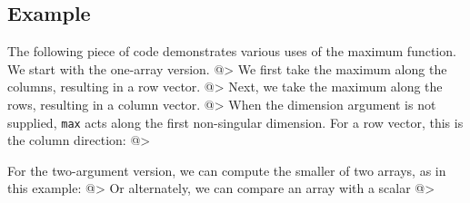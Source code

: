 \subsection{Example}

The following piece of code demonstrates various uses of the maximum
function.  We start with the one-array version.
@>
We first take the maximum along the columns, resulting in a row vector.
@>
Next, we take the maximum along the rows, resulting in a column vector.
@>
When the dimension argument is not supplied, \verb|max| acts along the first non-singular dimension.  For a row vector, this is the column direction:
@>

For the two-argument version, we can compute the smaller of two arrays,
as in this example:
@>
Or alternately, we can compare an array with a scalar
@>
